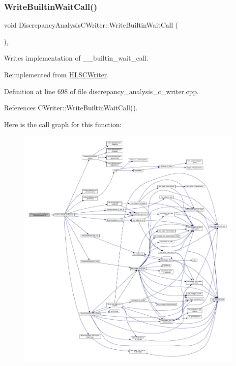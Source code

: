 \subsubsection{\texorpdfstring{Write\+Builtin\+Wait\+Call()}{WriteBuiltinWaitCall()}}
{\footnotesize\ttfamily void Discrepancy\+Analysis\+C\+Writer\+::\+Write\+Builtin\+Wait\+Call (\begin{DoxyParamCaption}{ }\end{DoxyParamCaption})\hspace{0.3cm}{\ttfamily [override]}, {\ttfamily [virtual]}}



Writes implementation of \+\_\+\+\_\+builtin\+\_\+wait\+\_\+call. 



Reimplemented from \hyperlink{classHLSCWriter_a7261192f62610bd053e5c35361ae1054}{H\+L\+S\+C\+Writer}.



Definition at line 698 of file discrepancy\+\_\+analysis\+\_\+c\+\_\+writer.\+cpp.



References C\+Writer\+::\+Write\+Builtin\+Wait\+Call().

Here is the call graph for this function\+:
\nopagebreak
\begin{figure}[H]
\begin{center}
\leavevmode
\includegraphics[width=350pt]{d4/d5c/classDiscrepancyAnalysisCWriter_a614b57f4cd76435c0b7266ac677145d5_cgraph}
\end{center}
\end{figure}
\mbox{\label{classDiscrepancyAnalysisCWriter_a174c35dd3c04952215d5a5f9aa0df0c9}} 
